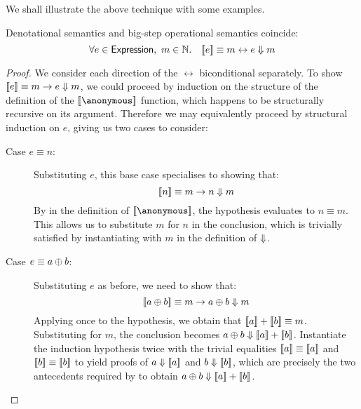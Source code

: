 We shall illustrate the above technique with some examples.

\begin{theorem}\label{thm:denote-big}
Denotational semantics and big-step operational semantics coincide:
\[
	\forall e \in \Expression,\ m \in \Nat.\quad
		\sb[e] \equiv m \leftrightarrow e \Eval m
\]
\end{theorem}

\begin{proof}
We consider each direction of the $\leftrightarrow$ biconditional
separately. To show $\sb[e] \equiv m \rightarrow e \Eval m$, we could
proceed by induction on the structure of the definition of the
$\sb[\anonymous]$ function, which happens to be structurally recursive on
its argument. Therefore we may equivalently proceed by structural induction
on $e$, giving us two cases to consider:
\begin{description}
\item[Case $e \equiv n$:]%
Substituting $e$, this base case specialises to showing that:
\[
	\sb[n] \equiv m \rightarrow n \Eval m
\]
By  in the definition of $\sb[\anonymous]$, the
hypothesis evaluates to $n \equiv m$. This allows us to substitute $m$ for
$n$ in the conclusion, which is trivially satisfied by instantiating
 with $m$ in the definition of ${\Downarrow}$.
\item[Case $e \equiv a \oplus b$:]%
Substituting $e$ as before, we need to show that:
\[
	\sb[a \Add b] \equiv m \rightarrow a \Add b \Eval m
\]
Applying  once to the hypothesis, we obtain that $\sb[a]
+ \sb[b] \equiv m$. Substituting for $m$, the conclusion becomes $a \Add
b \Eval \sb[a] + \sb[b]$. Instantiate the induction hypothesis twice
with the trivial equalities $\sb[a] \equiv \sb[a]$ and $\sb[b] \equiv
\sb[b]$ to yield proofs of $a \Eval \sb[a]$ and $b \Eval \sb[b]$,
which are precisely the two antecedents required by  to
obtain $a \Add b \Eval \sb[a] + \sb [b]$.
\end{description}


\end{proof}
